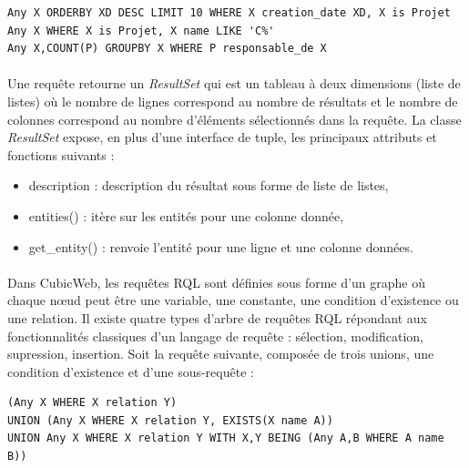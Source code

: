 \documentclass {report}
\begin{document}
\renewcommand{\lstlistingname}{Exemple}
\begin{lstlisting}[caption= Requêtes RQL]
Any X ORDERBY XD DESC LIMIT 10 WHERE X creation_date XD, X is Projet
Any X WHERE X is Projet, X name LIKE 'C%'
Any X,COUNT(P) GROUPBY X WHERE P responsable_de X
\end{lstlisting}

\paragraph{}
    Une requête retourne un \textit{ResultSet} qui est un tableau à deux dimensions (liste de listes) où le nombre de lignes correspond au nombre de résultats et le nombre de colonnes correspond au nombre d'éléments sélectionnés dans la requête. La classe \textit{ResultSet} expose, en plus d’une interface de tuple, les principaux attributs et fonctions suivants :
\begin{itemize}
\item description : description du résultat sous forme de liste de listes,
\item entities() : itère sur les entités pour une colonne donnée,
\item get\_entity() : renvoie l’entité pour une ligne et une colonne
données.
\end{itemize}

\paragraph{}
Dans CubicWeb, les requêtes RQL sont définies sous forme d'un graphe où chaque nœud peut être une variable, une constante, une condition d'existence ou une relation. Il existe quatre types d'arbre de requêtes RQL répondant aux fonctionnalités classiques d'un langage de requête : sélection, modification, supression, insertion. Soit la requête suivante, composée de trois unions, une condition d'existence et d'une sous-requête : 
\begin{lstlisting}[caption= Requête RQL]
(Any X WHERE X relation Y) 
UNION (Any X WHERE X relation Y, EXISTS(X name A))
UNION Any X WHERE X relation Y WITH X,Y BEING (Any A,B WHERE A name B))
\end{lstlisting}
\end{document}
